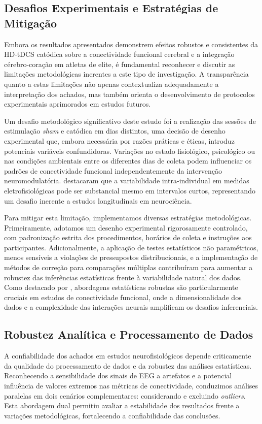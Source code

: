 \subsection{Desafios Experimentais e Estratégias de Mitigação}
Embora os resultados apresentados demonstrem efeitos robustos e consistentes da HD-tDCS catódica sobre a conectividade funcional cerebral e a integração cérebro-coração em atletas de elite, é fundamental reconhecer e discutir as limitações metodológicas inerentes a este tipo de investigação. A transparência quanto a estas limitações não apenas contextualiza adequadamente a interpretação dos achados, mas também orienta o desenvolvimento de protocolos experimentais aprimorados em estudos futuros.

Um desafio metodológico significativo deste estudo foi a realização das sessões de estimulação \emph{sham} e catódica em dias distintos, uma decisão de desenho experimental que, embora necessária por razões práticas e éticas, introduz potenciais variáveis confundidoras. Variações no estado fisiológico, psicológico ou nas condições ambientais entre os diferentes dias de coleta podem influenciar os padrões de conectividade funcional independentemente da intervenção neuromodulatória. \cite{kunze2014high} destacaram que a variabilidade intra-individual em medidas eletrofisiológicas pode ser substancial mesmo em intervalos curtos, representando um desafio inerente a estudos longitudinais em neurociência.

Para mitigar esta limitação, implementamos diversas estratégias metodológicas. Primeiramente, adotamos um desenho experimental rigorosamente controlado, com padronização estrita dos procedimentos, horários de coleta e instruções aos participantes. Adicionalmente, a aplicação de testes estatísticos não paramétricos, menos sensíveis a violações de pressupostos distribucionais, e a implementação de métodos de correção para comparações múltiplas contribuíram para aumentar a robustez das inferências estatísticas frente à variabilidade natural dos dados. Como destacado por \cite{bullmore2009complex}, abordagens estatísticas robustas são particularmente cruciais em estudos de conectividade funcional, onde a dimensionalidade dos dados e a complexidade das interações neurais amplificam os desafios inferenciais.

\subsection{Robustez Analítica e Processamento de Dados}
A confiabilidade dos achados em estudos neurofisiológicos depende criticamente da qualidade do processamento de dados e da robustez das análises estatísticas. Reconhecendo a sensibilidade dos sinais de EEG a artefatos e a potencial influência de valores extremos nas métricas de conectividade, conduzimos análises paralelas em dois cenários complementares: considerando e excluindo \textit{outliers}. Esta abordagem dual permitiu avaliar a estabilidade dos resultados frente a variações metodológicas, fortalecendo a confiabilidade das conclusões.

